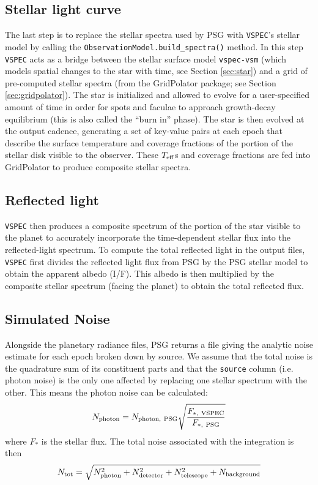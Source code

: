 \documentclass[linenumbers,5p,twocolumn,authoryear]{elsarticle}
\newcommand{\teff}{$T_{\rm eff}$}
\newcommand{\vspec}[1]{\texttt{VSPEC}#1}
\begin{document}
\subsection{Stellar light curve}
\label{subsec:stellar-lc}

The last step is to replace the stellar spectra used by PSG with \vspec{}'s stellar model by calling the \texttt{ObservationModel.build\_spectra()} method. In this step \vspec{} acts as a bridge between
the stellar surface model \texttt{vspec-vsm} (which models spatial changes to the star with time, see Section \ref{sec:star}) and a grid of
pre-computed stellar spectra (from the GridPolator package; see Section \ref{sec:gridpolator}). The star is initialized and allowed to evolve for a user-specified amount of time in order for spots and faculae to approach growth-decay equilibrium (this is also called the ``burn in'' phase). The star is then evolved at the output cadence, generating a set of key-value pairs at each epoch that describe the surface temperature and coverage fractions of the portion of the stellar disk visible to the observer. These \teff s and coverage fractions are fed into GridPolator to produce composite stellar spectra.

\subsection{Reflected light}
\label{subsec:reflected}
\vspec{} then produces a composite spectrum of the portion of the star visible to the planet to accurately incorporate the time-dependent stellar flux into the reflected-light spectrum. To compute the total reflected light in the output files, \vspec{} first divides the reflected light flux from PSG by the PSG stellar model to obtain the apparent albedo (I/F). This albedo is then multiplied by the composite stellar spectrum (facing the planet) to obtain the total reflected flux.

\subsection{Simulated Noise}
\label{subsec:noise}
Alongside the planetary radiance files, PSG returns a file giving the analytic noise estimate for each epoch broken down by source. We assume that the total noise is the quadrature sum of its constituent parts and that the \texttt{source} column (i.e. photon noise) is the only one affected by replacing one stellar spectrum with the other. This means the photon noise can be calculated:
\begin{equation}
    N_{\rm photon} = N_{\rm photon,~PSG} \sqrt{\frac{F_{*,\rm ~VSPEC}}{F_{*,\rm ~PSG}}}
\end{equation}
where $F_*$ is the stellar flux. The total noise associated with the integration is then
\begin{equation}
    N_{\rm tot} = \sqrt{
        N_{\rm photon}^2 + N_{\rm detector}^2 + N_{\rm telescope}^2 + N_{\rm background}
    }
\end{equation}
\end{document}

